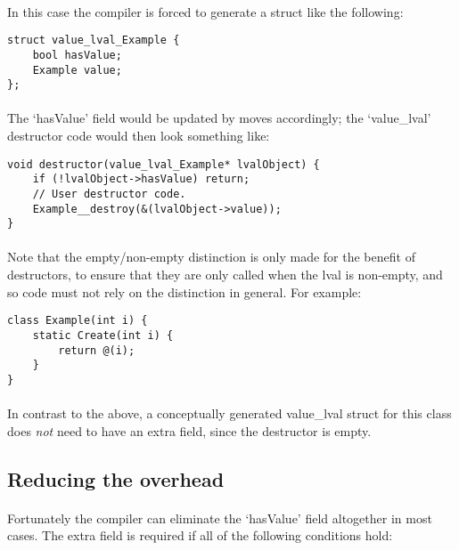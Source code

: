 \documentclass[12pt,twoside,notitlepage]{report}
\begin{document}
\paragraph{}
In this case the compiler is forced to generate a struct like the following:

\begin{lstlisting}
struct value_lval_Example {
	bool hasValue;
	Example value;
};
\end{lstlisting}

\paragraph{}
The `hasValue' field would be updated by moves accordingly; the `value\_lval' destructor code would then look something like:

\begin{lstlisting}
void destructor(value_lval_Example* lvalObject) {
	if (!lvalObject->hasValue) return;
	// User destructor code.
	Example__destroy(&(lvalObject->value));
}
\end{lstlisting}

\paragraph{}
Note that the empty/non-empty distinction is only made for the benefit of destructors, to ensure that they are only called when the lval is non-empty, and so code must not rely on the distinction in general. For example:

\begin{lstlisting}
class Example(int i) {
	static Create(int i) {
		return @(i);
	}
}
\end{lstlisting}

\paragraph{}
In contrast to the above, a conceptually generated value\_lval struct for this class does \emph{not} need to have an extra field, since the destructor is empty.

\subsection{Reducing the overhead}

\paragraph{}
Fortunately the compiler can eliminate the `hasValue' field altogether in most cases. The extra field is required if all of the following conditions hold:
\end{document}
